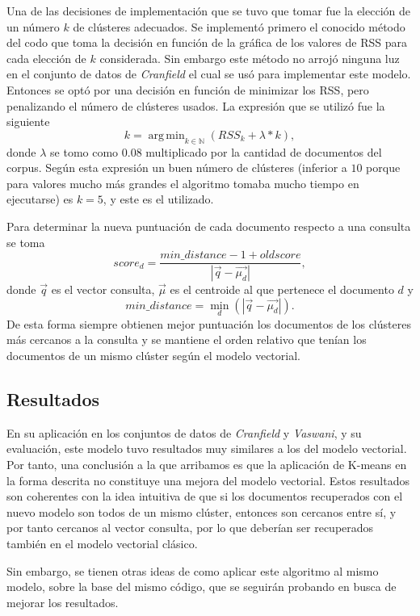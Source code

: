 \documentclass{llncs}
\DeclareMathOperator*{\argmin}{arg\,min}
\begin{document}
	 Una de las decisiones de implementaci\'on que se tuvo que tomar fue la elecci\'on de un n\'umero $k$ de cl\'usteres adecuados. Se implement\'o primero el conocido m\'etodo del codo que toma la decisi\'on en funci\'on de la gr\'afica de los valores de RSS para cada elecci\'on de $k$ considerada. Sin embargo este m\'etodo no arroj\'o ninguna luz en el conjunto de datos de \emph{Cranfield} el cual se us\'o para implementar este modelo. Entonces se opt\'o por una decisi\'on en funci\'on de minimizar los RSS, pero penalizando el n\'umero de cl\'usteres usados. La expresi\'on que se utiliz\'o fue la siguiente
	 \[
		k = \argmin_{k \in \mathbb{N}} (RSS_k + \lambda * k),
	 \]
	 donde $\lambda$ se tomo como $0.08$ multiplicado por la cantidad de documentos del corpus. Seg\'un esta expresi\'on un buen n\'umero de cl\'usteres (inferior a $10$ porque para valores mucho m\'as grandes el algoritmo tomaba mucho tiempo en ejecutarse) es $k=5$, y este es el utilizado.
	 
	 Para determinar la nueva puntuaci\'on de cada documento respecto a una consulta se toma 
	 \[score_d =  \frac{min\_distance - 1 + oldscore}{|\overrightarrow{q} - \overrightarrow{\mu_d}|},\]
	 donde $\overrightarrow{q}$ es el vector consulta, $\overrightarrow{\mu}$ es el centroide al que pertenece el documento $d$ y
	 \[ min\_distance = \min_{d}(|\overrightarrow{q} - \overrightarrow{\mu_d}|).\]
	 De esta forma siempre obtienen mejor puntuaci\'on los documentos de los cl\'usteres m\'as cercanos a la consulta y se mantiene el orden relativo que ten\'ian los documentos de un mismo cl\'uster seg\'un el modelo vectorial.
	 
	 \subsection{Resultados}
	 
	 En su aplicaci\'on en los conjuntos de datos de \emph{Cranfield} y \emph{Vaswani}, y su evaluaci\'on, este modelo tuvo resultados muy similares a los del modelo vectorial. Por tanto, una conclusi\'on a la que arribamos es que la aplicaci\'on de K-means en la forma descrita no constituye una mejora del modelo vectorial. Estos resultados son coherentes con la idea intuitiva de que si los documentos recuperados con el nuevo modelo son todos de un mismo cl\'uster, entonces son cercanos entre s\'i, y por tanto cercanos al vector consulta, por lo que deber\'ian ser recuperados tambi\'en en el modelo vectorial cl\'asico.
	 
	 Sin embargo, se tienen otras ideas de como aplicar este algoritmo al mismo modelo, sobre la base del mismo c\'odigo, que se seguir\'an probando en busca de mejorar los resultados.
	 
\end{document}
